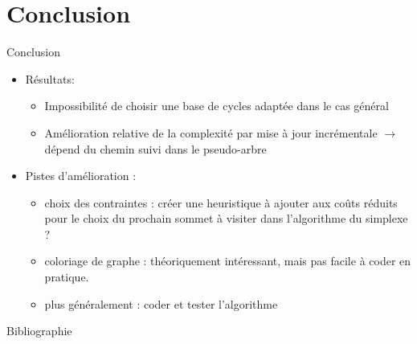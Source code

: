 \documentclass{beamer}
\begin{document}
\section{Conclusion}
\begin{frame}{Conclusion}
    \begin{itemize}
        \item Résultats: 
        \begin{itemize}
            \item Impossibilité de choisir une base de cycles adaptée dans le cas général
            \item Amélioration relative de la complexité par mise à jour incrémentale $\rightarrow$ dépend du chemin suivi dans le pseudo-arbre
        \end{itemize}
        \item Pistes d'amélioration :
            \begin{itemize}
                \item choix des contraintes : créer une heuristique à ajouter aux coûts réduits pour le choix du prochain sommet à visiter dans l'algorithme du simplexe ?
                \item coloriage de graphe : théoriquement intéressant, mais pas facile à coder en pratique.
                \item plus généralement : coder et tester l'algorithme
            \end{itemize}
    \end{itemize}
    
\end{frame}

\begin{frame}{Bibliographie}
\nocite{*}



\insertframenumber\end{frame}
\end{document}

